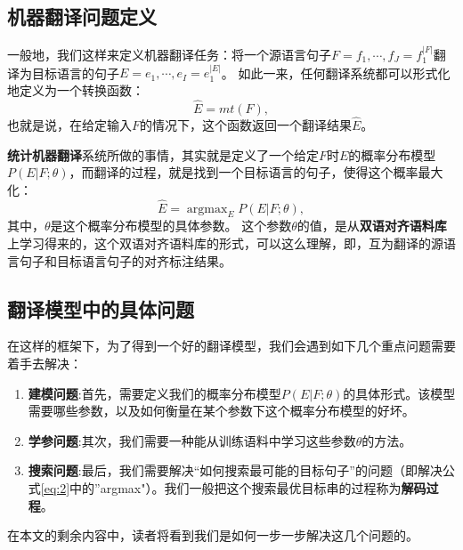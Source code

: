 \documentclass[10pt,a4paper]{ctexart}
\begin{document}
\subsection{机器翻译问题定义}
一般地，我们这样来定义机器翻译任务：将一个源语言句子$F = f_1,\cdots,f_J = f_1^{|F|}$翻译为目标语言的句子$E = e_1,\cdots,e_I = e_1^{|E|}$。
如此一来，任何翻译系统都可以形式化地定义为一个转换函数：
\begin{equation}\label{eq:1}
  \hat{E} = mt(F),
\end{equation}
也就是说，在给定输入$F$的情况下，这个函数返回一个翻译结果$\hat{E}$。

\textbf{统计机器翻译}系统所做的事情，其实就是定义了一个给定$F$时$E$的概率分布模型$P(E|F;\theta)$，而翻译的过程，就是找到一个目标语言的句子，使得这个概率最大化：
\begin{equation}\label{eq:2}
 \hat{E} = \mathop{\arg\max}_{E} P(E|F;\theta),
\end{equation}
其中，$\theta$是这个概率分布模型的具体参数。
这个参数$\theta$的值，是从\textbf{双语对齐语料库}上学习得来的，这个双语对齐语料库的形式，可以这么理解，即，互为翻译的源语言句子和目标语言句子的对齐标注结果。

\subsection{翻译模型中的具体问题}
在这样的框架下，为了得到一个好的翻译模型，我们会遇到如下几个重点问题需要着手去解决：
\begin{enumerate}
\item[] \textbf{建模问题}:首先，需要定义我们的概率分布模型$P(E | F;\theta)$的具体形式。该模型需要哪些参数，以及如何衡量在某个参数下这个概率分布模型的好坏。
\item[] \textbf{学参问题}:其次，我们需要一种能从训练语料中学习这些参数$\theta$的方法。
\item[] \textbf{搜索问题}:最后，我们需要解决“如何搜索最可能的目标句子”的问题（即解决公式\ref{eq:2}中的''argmax"）。我们一般把这个搜索最优目标串的过程称为\textbf{解码过程}。
\end{enumerate}

在本文的剩余内容中，读者将看到我们是如何一步一步解决这几个问题的。

\newpage
\end{document}

